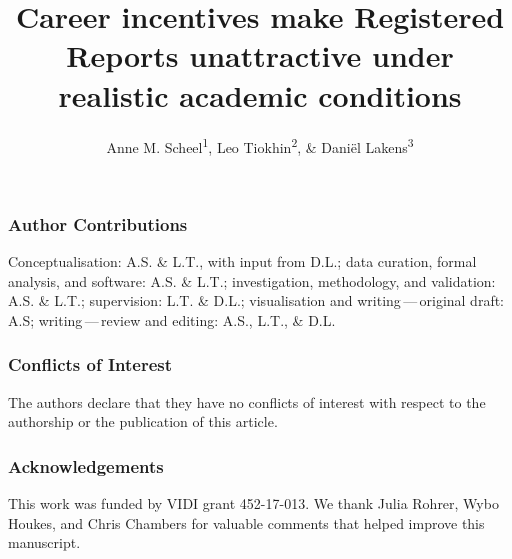 \documentclass[
  british,
  a4paper,
  ,man,floatsintext]{apa6}
\title{Career incentives make Registered Reports unattractive under realistic academic conditions}
\author{Anne M. Scheel\textsuperscript{1}, Leo Tiokhin\textsuperscript{2}, \& Daniël Lakens\textsuperscript{3}}
\date{}
\affiliation{\vspace{0.5cm}\textsuperscript{1} Utrecht University\\\textsuperscript{2} Deciding Better\\\textsuperscript{3} Eindhoven University of Technology}
\begin{document}
\maketitle

\subsubsection{Author Contributions}\label{author-contributions}

Conceptualisation: A.S. \& L.T., with input from D.L.; data curation, formal analysis, and software: A.S. \& L.T.; investigation, methodology, and validation: A.S. \& L.T.; supervision: L.T. \& D.L.; visualisation and writing\(\,\)---\(\,\)original draft: A.S; writing\(\,\)---\(\,\)review and editing: A.S., L.T., \& D.L.

\subsubsection{Conflicts of Interest}\label{conflicts-of-interest}

The authors declare that they have no conflicts of interest with respect to the authorship or the publication of this article.

\subsubsection{Acknowledgements}\label{acknowledgements}

This work was funded by VIDI grant 452-17-013. We thank Julia Rohrer, Wybo Houkes, and Chris Chambers for valuable comments that helped improve this manuscript.
\end{document}
